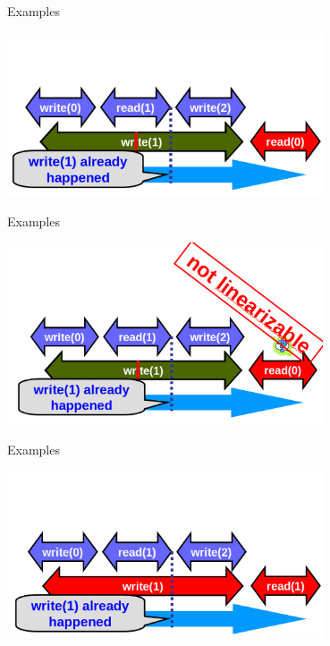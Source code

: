 \begin{frame}{Examples}
\begin{center} \includegraphics[width=0.7\textwidth]{./pics/linear/83.png} \end{center}
\end{frame}

\begin{frame}{Examples}
\begin{center} \includegraphics[width=0.7\textwidth]{./pics/linear/84.png} \end{center}
\end{frame}

\begin{frame}{Examples}
\begin{center} \includegraphics[width=0.7\textwidth]{./pics/linear/85.png} \end{center}
\end{frame}

